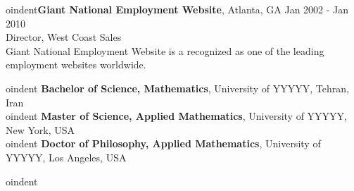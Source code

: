 \documentclass[11pt]{article}
\begin{document}
oindent{\bf Giant National Employment Website}, Atlanta, GA  \hfill Jan 2002 - Jan 2010 \\ \vspace{-1mm}
\hspace{4mm} Director, West Coast Sales \\
Giant National Employment Website is a recognized as one of the leading employment websites worldwide.


\vspace{3mm}

oindent {\bf Bachelor of Science, Mathematics}, University of YYYYY, Tehran, Iran\\

oindent {\bf Master of Science, Applied Mathematics}, University of YYYYY, New York, USA\\

oindent {\bf Doctor of Philosophy, Applied Mathematics}, University of YYYYY, Los Angeles, USA

\vfill 
oindent \fontsize{5}{5}


\end{document}
